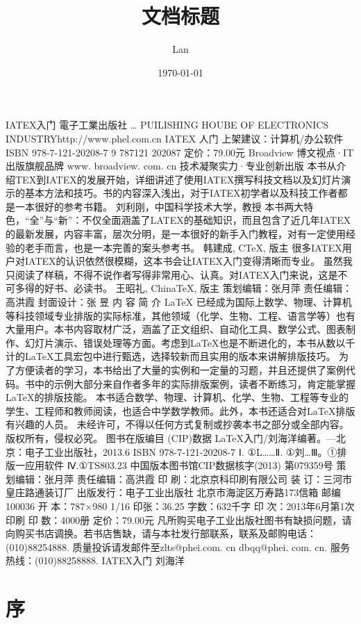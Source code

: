 \documentclass[UTF8]{ctexart}
\title{文档标题}
\author{Lan}
\date{\today}
\begin{document}
\maketitle
\tableofcontents


IATEX入门
電子工業出版社
…
PUILISHING HOUBE OF ELECTRONICS INDUSTRYhttp://www.phel.com.cn
IATEX
人门
上架建议：计算机/办公软件
ISBN 978-7-121-20208-7
9 787121 202087
定价：79.00元
Broadview	博文视点·IT出版旗舰品牌
www. broadview. com. cn	技术凝聚实力·专业创新出版
本书从介绍TEX到IATEX的发展开始，详细讲述了使用IATEX撰写科技文档以及幻灯片演示的基本方法和技巧。书的内容深入浅出，对于IATEX初学者以及科技工作者都是一本很好的参考书籍。
刘利刚，中国科学技术大学，教授
本书两大特色，“全”与“新”：不仅全面涵盖了LATEX的基础知识，而且包含了近几年IATEX的最新发展，内容丰富，层次分明，是一本很好的新手入门教程，对有一定使用经验的老手而言，也是一本完善的案头参考书。
韩建成, CTeX, 版主
很多IATEX用户对IATEX的认识依然很模糊，这本书会让IATEX入门变得清晰而专业。
虽然我只阅读了样稿，不得不说作者写得非常用心、认真。对IATEX入门来说，这是不可多得的好书、必读书。
王昭礼, ChinaTeX, 版主
策划编辑：张月萍
责任编辑：高洪霞
封面设计：张	昱
内	容	简	介
LaTeX 已经成为国际上数学、物理、计算机等科技领域专业排版的实际标准，其他领域（化学、生物、工程、语言学等）也有大量用户。本书内容取材广泛，涵盖了正文组织、自动化工具、数学公式、图表制作、幻灯片演示、错误处理等方面。考虑到LaTeX也是不断进化的，本书从数以千计的LaTeX工具宏包中进行甄选，选择较新而且实用的版本来讲解排版技巧。
为了方便读者的学习，本书给出了大量的实例和一定量的习题，并且还提供了案例代码。书中的示例大部分来自作者多年的实际排版案例，读者不断练习，肯定能掌握LaTeX的排版技能。
本书适合数学、物理、计算机、化学、生物、工程等专业的学生、工程师和教师阅读，也适合中学数学教师。此外，本书还适合对LaTeX排版有兴趣的人员。
未经许可，不得以任何方式复制或抄袭本书之部分或全部内容。
版权所有，侵权必究。
图书在版编目 (CIP)数据
LaTeX入门/刘海洋编著。—北京：电子工业出版社，2013.6
ISBN 978-7-121-20208-7
Ⅰ. ①L……Ⅱ. ①刘…Ⅲ。①排版一应用软件 Ⅳ.①TS803.23
中国版本图书馆CIP数据核字(2013) 第079359号
策划编辑：张月萍
责任编辑：高洪霞
印   刷：北京京科印刷有限公司
装   订：三河市皇庄路通装订厂
出版发行：电子工业出版社
北京市海淀区万寿路173信箱  邮编100036
开   本：787×980  1/16  印张：36.25  字数：632千字
印   次：2013年6月第1次印刷
印   数：4000册   定价：79.00元
凡所购买电子工业出版社图书有缺损问题，请向购买书店调换。若书店售缺，请与本社发行部联系，联系及邮购电话：(010)88254888.
质量投诉请发邮件至zlts@phei.com. cn                       dbqq@phei. com. cn.
服务热线：(010)88258888.
IATEX入门
刘海洋

\section{序}%
\label{sec:序}
\end{document}
